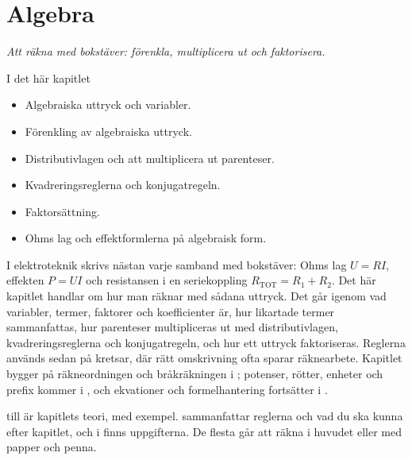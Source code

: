 
\chapter{Algebra}
\label{c2:ch}

{\large\itshape Att räkna med bokstäver: förenkla, multiplicera ut och faktorisera.\par}

\begin{chapterbox}{I det här kapitlet}
\begin{itemize}
  \item Algebraiska uttryck och variabler.
  \item Förenkling av algebraiska uttryck.
  \item Distributivlagen och att multiplicera ut parenteser.
  \item Kvadreringsreglerna och konjugatregeln.
  \item Faktorsättning.
  \item Ohms lag och effektformlerna på algebraisk form.
\end{itemize}
\end{chapterbox}

I elektroteknik skrivs nästan varje samband med bokstäver: Ohms lag $U = RI$, effekten $P = UI$ och
resistansen i en seriekoppling $R_{\text{TOT}} = R_1 + R_2$. Det här kapitlet handlar om hur man
räknar med sådana uttryck. Det går igenom vad variabler, termer, faktorer och koefficienter är, hur
likartade termer sammanfattas, hur parenteser multipliceras ut med distributivlagen,
kvadreringsreglerna och konjugatregeln, och hur ett uttryck faktoriseras. Reglerna används sedan på
kretsar, där rätt omskrivning ofta sparar räknearbete. Kapitlet bygger på räkneordningen och
bråkräkningen i ; potenser, rötter, enheter och prefix kommer i , och ekvationer
och formelhantering fortsätter i .

 till  är kapitlets teori, med exempel.
 sammanfattar reglerna och vad du ska kunna efter kapitlet, och i
 finns uppgifterna. De flesta går att räkna i huvudet eller med papper och
penna.




